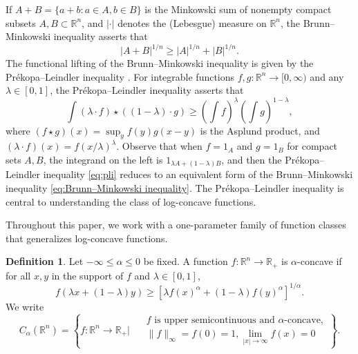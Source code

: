 \documentclass[11pt]{amsart}
\newcommand{\R}{{\mathbb R}}
\theoremstyle{plain}
\theoremstyle{definition}
\newtheorem{defn}[theorem]{Definition}
\theoremstyle{remark}
\begin{document}
If $A+B=\{a+b: a \in A, b \in B\}$ is the Minkowski sum of nonempty compact subsets $A, B \subset \mathbb{R}^n$, and $|\cdot|$ denotes the (Lebesgue) measure on $\R^n$, the Brunn--Minkowski inequality asserts that
\begin{equation}
    \label{eq:Brunn–Minkowski inequality}
    |A+B|^{1 / n} \geq|A|^{1 / n}+|B|^{1 / n}.
\end{equation}
The functional lifting of the Brunn--Minkowski inequality is given by the Pr\'ekopa--Leindler inequality \cite{P-73,L-72}. For integrable functions $f,g :\R^n \to [0,\infty)$ and any $\lambda \in [0,1]$, the Pr\'ekopa--Leindler inequality asserts that
\begin{equation}
    \label{eq:pli}
    \int \left(\lambda \cdot f\right) \star \left((1-\lambda) \cdot g\right)
    \geq
    \left( \int f \right)^{\lambda}
    \left( \int g \right)^{1-\lambda},
\end{equation}
where
$
    (f \star g) (x) =\sup_y f(y) g(x-y)
$
is the Asplund product, and $(\lambda \cdot f) (x) = f(x/\lambda)^\lambda$.
Observe that when $f = 1_A$ and  $g = 1_B$ for compact sets $A, B$,  the integrand on the left is $1_{\lambda A + (1-\lambda)B}$, and then the Pr\'ekopa--Leindler inequality \eqref{eq:pli} reduces to an equivalent form of the Brunn--Minkowski inequality \eqref{eq:Brunn–Minkowski inequality}. The Pr\'ekopa--Leindler inequality is central to understanding the class of log-concave functions.

Throughout this paper, we work with a one-parameter family of function classes that generalizes log-concave functions.

\begin{defn} \label{def:C_alpha}
Let $-\infty \leq \alpha \leq 0$ be fixed. A function $f: \mathbb{R}^n\to \mathbb{R}_+$ is $\alpha$-concave if for all $x,y$ in the support of $f$ and $\lambda \in [0,1]$,
\begin{equation}
    f(\lambda x + (1 - \lambda)y)
    \geq \left[\lambda f(x)^\alpha + (1 - \lambda)f(y)^\alpha\right]^{1/\alpha}.
\end{equation}
We write
\begin{equation*}
C_\alpha(\mathbb{R}^n)=
\left\{f: \mathbb{R}^n\to \mathbb{R}_+  \Bigg|\begin{aligned}
\,\,\, & f \text{ is upper semicontinuous and $\alpha$-concave}  , \\
&\|f\|_{\infty}=f(0)=1, \lim_{|x| \to \infty}  f(x) = 0
\end{aligned}\right\}.
\end{equation*}
\end{defn}
\end{document}
